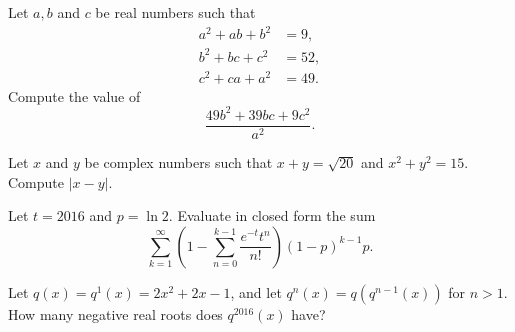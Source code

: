 %	





\begin{question}[name={2016 HMMT, Algebra, \href{https://artofproblemsolving.com/community/c129h1359321p7444574}{Problem 10}}]
	Let $a,b$ and $c$ be real numbers such that
	\begin{align*}
		a^2+ab+b^2&=9, \\
		b^2+bc+c^2&=52, \\
		c^2+ca+a^2&=49.
	\end{align*}Compute the value of $$\dfrac{49b^2+39bc+9c^2}{a^2}.$$
\end{question}


%	





\begin{question}[name={2016 HMMT, Guts, \href{https://artofproblemsolving.com/community/c129h1359322p7444579}{Problem 1}}]
	Let $x$ and $y$ be complex numbers such that $x+y=\sqrt{20}$ and $x^2+y^2=15$. Compute $|x-y|$.	
\end{question}




%	








\begin{question}[name={2016 HMMT, Guts, \href{https://artofproblemsolving.com/community/c129h1359347p7444627}{Problem 23}}]
	Let $t = 2016$ and $p = \ln 2$. Evaluate in closed form the sum
	\[ \sum_{k=1}^{\infty} 
	\left(
	1-\sum_{n=0}^{k-1}\frac{e^{-t}t^{n}}{n!}
	\right)
	\left(1-p\right)^{k-1}p. \]
\end{question}




%	





\begin{question}[name={2016 HMMT, Team, \href{https://artofproblemsolving.com/community/c129h1361533p7462731}{Problem 7}}]
	Let $q(x) = q^1(x) = 2x^2 + 2x - 1$, and let $q^n(x) = q(q^{n-1}(x))$ for $n > 1$.
	How many negative real roots does $q^{2016}(x)$ have?
\end{question}




